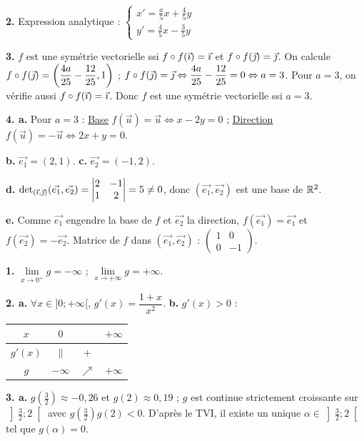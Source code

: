 \documentclass[11pt]{article}
\begin{document}
\textbf{2.} Expression analytique : $\begin{cases} x' = \frac{a}{5}x + \frac{4}{5}y \\[2pt] y' = \frac{4}{5}x - \frac{3}{5}y \end{cases}$

\textbf{3.} $f$ est une symétrie vectorielle ssi $f\circ f(\vec{\imath}) = \vec{\imath}$ et $f\circ f(\vec{\jmath}) = \vec{\jmath}$. On calcule $f\circ f(\vec{\jmath}) = \left(\dfrac{4a}{25} - \dfrac{12}{25}, 1\right)$ ; $f\circ f(\vec{\jmath}) = \vec{\jmath} \Leftrightarrow \dfrac{4a}{25} - \dfrac{12}{25} = 0 \Leftrightarrow a = 3$. Pour $a = 3$, on vérifie aussi $f\circ f(\vec{\imath}) = \vec{\imath}$. Donc $f$ est une symétrie vectorielle ssi $a = 3$.

\textbf{4. a.} Pour $a = 3$ : \underline{Base} $f(\vec{u}) = \vec{u} \Leftrightarrow x - 2y = 0$ ; \underline{Direction} $f(\vec{u}) = -\vec{u} \Leftrightarrow 2x + y = 0$.

\textbf{b.} $\vec{e_1} = (2, 1)$. \quad \textbf{c.} $\vec{e_2} = (-1, 2)$.

\textbf{d.} $\det_{(\vec{\imath},\vec{\jmath})}(\vec{e_1}, \vec{e_2}) = \begin{vmatrix} 2 & -1 \\ 1 & 2 \end{vmatrix} = 5 \ne 0$, donc $(\vec{e_1}, \vec{e_2})$ est une base de $\mathbb{R}^2$.

\textbf{e.} Comme $\vec{e_1}$ engendre la base de $f$ et $\vec{e_2}$ la direction, $f(\vec{e_1}) = \vec{e_1}$ et $f(\vec{e_2}) = -\vec{e_2}$. Matrice de $f$ dans $(\vec{e_1}, \vec{e_2})$ : $\begin{pmatrix} 1 & 0 \\ 0 & -1 \end{pmatrix}$.

\textbf{1.} $\lim\limits_{x\to 0^+} g = -\infty$ ; $\lim\limits_{x\to+\infty} g = +\infty$.

\textbf{2. a.} $\forall x \in ]0;+\infty[$, $g'(x) = \dfrac{1 + x}{x^2}$. \textbf{b.} $g'(x) > 0$ :
\begin{center}\renewcommand{\arraystretch}{1.4}
\begin{tabular}{|c|ccc|}
\hline $x$ & $0$ & & $+\infty$ \\\hline $g'(x)$ & $\|$ & $+$ & \\\hline $g$ & $-\infty$ & $\nearrow$ & $+\infty$ \\\hline
\end{tabular}
\end{center}

\textbf{3. a.} $g\left(\tfrac{3}{2}\right) \approx -0{,}26$ et $g(2) \approx 0{,}19$ ; $g$ est continue strictement croissante sur $\left]\tfrac{3}{2};2\right[$ avec $g(\tfrac{3}{2})g(2) < 0$. D'après le TVI, il existe un unique $\alpha \in \left]\tfrac{3}{2};2\right[$ tel que $g(\alpha) = 0$.
\end{document}
